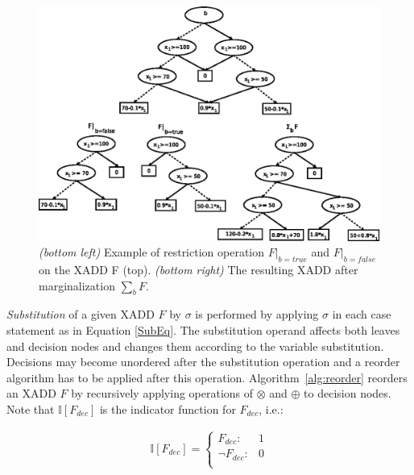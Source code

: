 \documentclass[twoside,11pt]{article}
\begin{document}
\begin{figure}[t!]
\centering
\includegraphics[width=1\textwidth]{FiguresSource/restriction.eps}

\caption{%
{\it (bottom left)} Example of restriction operation $F|_{b=true}$ and $F|_{b=false}$ on the XADD F (top). {\it (bottom right)} The resulting XADD after marginalization $\sum_{b}F$.}
\label{fig:restrict}
\end{figure}

 
\emph{Substitution} of a given XADD $F$ by $\sigma$ is performed by applying $\sigma$ in each case statement as in Equation \ref{SubEq}. The substitution operand affects both leaves and decision nodes and changes them according to the variable substitution. 
Decisions may become unordered after the substitution operation  and a reorder algorithm has to be applied after this operation. Algorithm~\ref{alg:reorder} reorders an XADD $F$ by recursively applying  operations of $\otimes$ and $\oplus$ to decision nodes. Note that $\mathbb{I}[\mathit{F_{dec}}]$ is the indicator function for $F_{dec}$, i.e.:

{%
\begin{align*}
\mathbb{I}[\mathit{F_{dec}}] = 
\begin{cases}
  F_{dec}: & 1 \\ 
  \neg F_{dec}: & 0 \\ 
\end{cases}
\end{align*}
}
\end{document}
